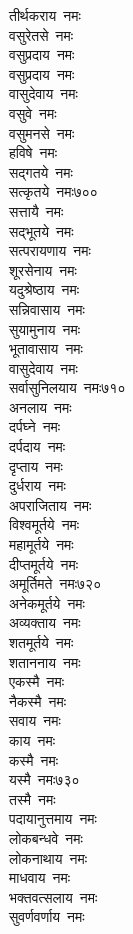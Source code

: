 \begin{multicols}{\maxColumns}
\begin{flushleft}
तीर्थकराय~नमः\\
वसुरेतसे~नमः\\
वसुप्रदाय~नमः\\
वसुप्रदाय~नमः\\
वासुदेवाय~नमः\\
वसुवे~नमः\\
वसुमनसे~नमः\\
हविषे~नमः\\
सद्गतये~नमः\\
सत्कृतये~नमः\hfill ७००\\
सत्तायै~नमः\\
सद्भूतये~नमः\\
सत्परायणाय~नमः\\
शूरसेनाय~नमः\\
यदुश्रेष्ठाय~नमः\\
सन्निवासाय~नमः\\
सुयामुनाय~नमः\\
भूतावासाय~नमः\\
वासुदेवाय~नमः\\
सर्वासुनिलयाय~नमः\hfill ७१०\\
अनलाय~नमः\\
दर्पघ्ने~नमः\\
दर्पदाय~नमः\\
दृप्ताय~नमः\\
दुर्धराय~नमः\\
अपराजिताय~नमः\\
विश्वमूर्तये~नमः\\
महामूर्तये~नमः\\
दीप्तमूर्तये~नमः\\
अमूर्तिमते~नमः\hfill ७२०\\
अनेकमूर्तये~नमः\\
अव्यक्ताय~नमः\\
शतमूर्तये~नमः\\
शताननाय~नमः\\
एकस्मै~नमः\\
नैकस्मै~नमः\\
सवाय~नमः\\
काय~नमः\\
कस्मै~नमः\\
यस्मै~नमः\hfill ७३०\\
तस्मै~नमः\\
पदायानुत्तमाय~नमः\\
लोकबन्धवे~नमः\\
लोकनाथाय~नमः\\
माधवाय~नमः\\
भक्तवत्सलाय~नमः\\
सुवर्णवर्णाय~नमः\\

\end{flushleft}
\end{multicols}
